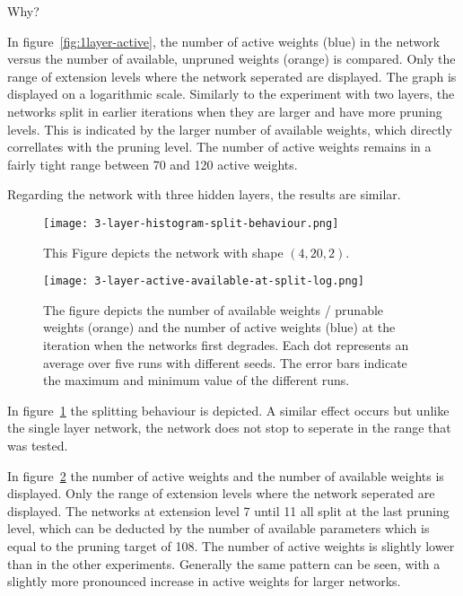 Why? 

In figure~\ref{fig:1layer-active}, the number of active weights (blue) in the network versus the number of available, unpruned weights (orange) is compared.
Only the range of extension levels where the network seperated are displayed.
The graph is displayed on a logarithmic scale.
Similarly to the experiment with two layers, the networks split in earlier iterations when they are larger and have more pruning levels.
This is indicated by the larger number of available weights, which directly correllates with the pruning level.
The number of active weights remains in a fairly tight range between 70 and 120 active weights.

Regarding the network with three hidden layers, the results are similar.
\begin{figure}[ht]
    \centering
    \texttt{[image: 3-layer-histogram-split-behaviour.png]}
    \caption{
        This Figure depicts the network with shape $(4,20,2)$.
    }\label{fig:3layer-histogram}
\end{figure}

\begin{figure}[ht]
    
    \centering
    \texttt{[image: 3-layer-active-available-at-split-log.png]}
    \caption{
        The figure depicts the number of available weights / prunable weights (orange) and the number of active weights (blue) at the iteration when the networks first degrades.
    Each dot represents an average over five runs with different seeds.
    The error bars indicate the maximum and minimum value of the different runs.
    }\label{fig:3layer-active}
\end{figure}

In figure~\ref{fig:3layer-histogram} the splitting behaviour is depicted.
A similar effect occurs but unlike the single layer network, the network does not stop to seperate in the range that was tested. 

In figure~\ref{fig:3layer-active} the number of active weights and the number of available weights is displayed.
Only the range of extension levels where the network seperated are displayed.
The networks at extension level 7 until 11 all split at the last pruning level, which can be deducted by the number of available parameters which is equal to the pruning target of 108.
The number of active weights is slightly lower than in the other experiments.
Generally the same pattern can be seen, with a slightly more pronounced increase in active weights for larger networks.

